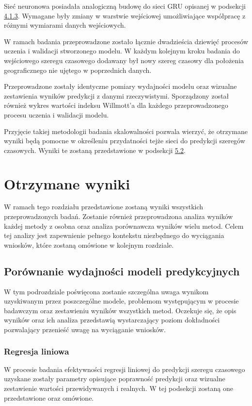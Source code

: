 \documentclass[10pt,a4paper]{article}
\begin{document}
Sieć neuronowa posiadała analogiczną budowę do sieci GRU opisanej w podsekcji \hyperlink{subsubsection.4.1.3}{4.1.3}. Wymagane były zmiany w warstwie wejściowej umożliwiające współpracę z różnymi wymiarami danych wejściowych.

W ramach badania przeprowadzone zostało łącznie dwadzieścia dziewięć procesów uczenia i walidacji stworzonego modelu. W każdym kolejnym kroku badania do wejściowego szeregu czasowego dodawany był nowy szereg czasowy dla położenia geograficznego nie ujętego w poprzednich danych. 

Przeprowadzone zostały identyczne pomiary wydajności modelu oraz wizualne zestawienia wyników predykcji z danymi rzeczywistymi. Sporządzony został również wykres wartości indeksu Willmott'a dla każdego przeprowadzonego procesu uczenia i walidacji modelu.

Przyjęcie takiej metodologii badania skalowalności pozwala wierzyć, że otrzymane wyniki będą pomocne w określeniu przydatności tejże sieci do predykcji szeregów czasowych. Wyniki te zostaną przedstawione w podsekcji \hyperlink{subsection.5.2}{5.2}.

\newpage
\section{Otrzymane wyniki}
W ramach tego rozdziału przedstawione zostaną wyniki wszystkich przeprowadzonych badań. Zostanie również przeprowadzona analiza wyników każdej metody z osobna oraz analiza porównawcza wyników wielu metod. Celem tej analizy jest zapewnienie pełnego kontekstu niezbędnego do wyciągania wniosków, które zostaną omówione w kolejnym rozdziale. 

\subsection{Porównanie wydajności modeli predykcyjnych}
W tym podrozdziale poświęcona zostanie szczególna uwaga wynikom uzyskiwanym przez poszczególne modele, problemom występującym w procesie badawczym oraz zestawieniu wyników wszystkich metod. Oczekuje się, że opis wyników oraz ich analiza przedstawią wystarczający poziom dokładności pozwalający przenieść uwagę na wyciąganie wniosków.
 
\subsubsection{Regresja liniowa}
W procesie badania efektywności regresji liniowej do predykcji szeregu czasowego uzyskane zostały parametry opisujące poprawność predykcji oraz wizualne zestawienie wartości przewidywanych i realnych. W tej podsekcji zostaną one przedstawione oraz omówione. 
\end{document}

